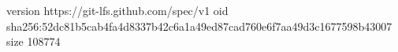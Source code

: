 version https://git-lfs.github.com/spec/v1
oid sha256:52dc81b5cab4fa4d8337b42c6a1a49ed87cad760e6f7aa49d3c1677598b43007
size 108774
